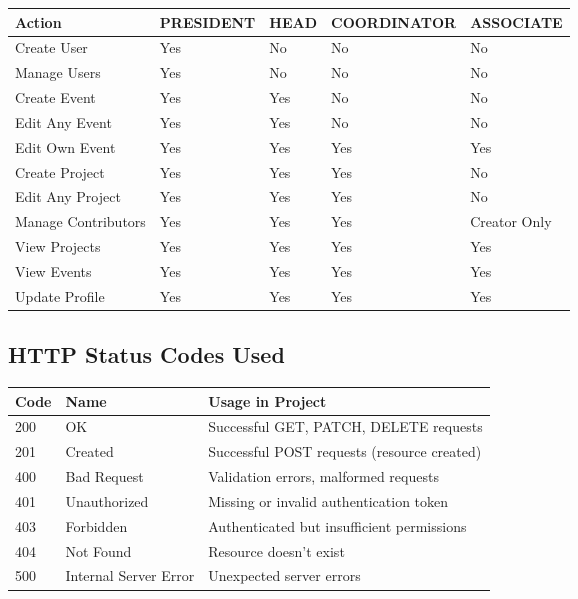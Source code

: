 \documentclass[11pt,a4paper]{article}
\begin{document}
\begin{tabular}{|p{3cm}|p{2cm}|p{2cm}|p{2cm}|p{2cm}|}
\hline
\textbf{Action} & \textbf{PRESIDENT} & \textbf{HEAD} & \textbf{COORDINATOR} & \textbf{ASSOCIATE} \\
\hline
Create User & Yes & No & No & No \\
\hline
Manage Users & Yes & No & No & No \\
\hline
Create Event & Yes & Yes & No & No \\
\hline
Edit Any Event & Yes & Yes & No & No \\
\hline
Edit Own Event & Yes & Yes & Yes & Yes \\
\hline
Create Project & Yes & Yes & Yes & No \\
\hline
Edit Any Project & Yes & Yes & Yes & No \\
\hline
Manage Contributors & Yes & Yes & Yes & Creator Only \\
\hline
View Projects & Yes & Yes & Yes & Yes \\
\hline
View Events & Yes & Yes & Yes & Yes \\
\hline
Update Profile & Yes & Yes & Yes & Yes \\
\hline
\end{tabular}


\subsection{HTTP Status Codes Used}
\begin{tabular}{|p{2cm}|p{4cm}|p{8cm}|}
\hline
\textbf{Code} & \textbf{Name} & \textbf{Usage in Project} \\
\hline
200 & OK & Successful GET, PATCH, DELETE requests \\
\hline
201 & Created & Successful POST requests (resource created) \\
\hline
400 & Bad Request & Validation errors, malformed requests \\
\hline
401 & Unauthorized & Missing or invalid authentication token \\
\hline
403 & Forbidden & Authenticated but insufficient permissions \\
\hline
404 & Not Found & Resource doesn't exist \\
\hline
500 & Internal Server Error & Unexpected server errors \\
\hline
\end{tabular}
\end{document}

